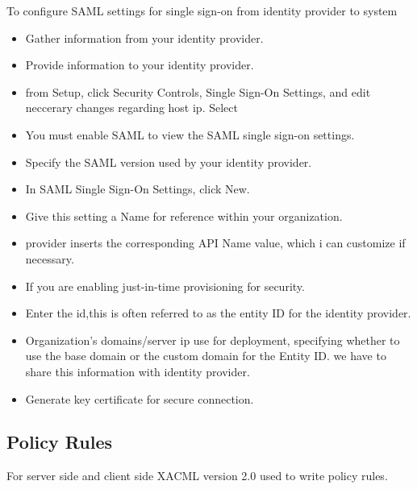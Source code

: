 To configure SAML settings for single sign-on from identity provider to system
\begin{itemize}
\item Gather information from your identity provider.
\item Provide information to your identity provider.
\item from Setup, click Security Controls, Single Sign-On Settings, and edit neccerary changes regarding host ip.
Select
\item You must enable SAML to view the SAML single sign-on settings.
\item Specify the SAML version used by your identity provider.
\item In SAML Single Sign-On Settings, click New.
\item Give this setting a Name for reference within your organization.
\item provider inserts the corresponding API Name value, which i can customize if necessary.
\item If you are enabling just-in-time provisioning for security.
\item Enter the id,this is often referred to as the entity ID for the identity provider.
\item Organization's domains/server ip use for deployment, specifying whether to use the base domain or the custom domain for the Entity ID. we have to share this information with identity provider.
\item Generate key certificate for secure connection. 
\end{itemize}

\subsection{Policy Rules}
\hspace{5mm} For server side and client side XACML version 2.0 used to write policy rules.
